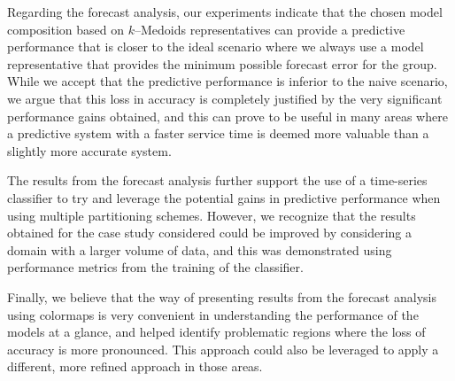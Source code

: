 Regarding the forecast analysis, our experiments indicate that the chosen model composition based on $k$--Medoids representatives can provide a predictive performance that is closer to the ideal scenario where we always use a model representative that provides the minimum possible forecast error for the group. While we accept that the predictive performance is inferior to the naive scenario, we argue that this loss in accuracy is completely justified by the very significant performance gains obtained, and this can prove to be useful in many areas where a predictive system with a faster service time is deemed more valuable than a slightly more accurate system.

The results from the forecast analysis further support the use of a time-series classifier to try and leverage the potential gains in predictive performance when using multiple partitioning schemes. However, we recognize that the results obtained for the case study considered could be improved by considering a domain with a larger volume of data, and this was demonstrated using performance metrics from the training of the classifier.

Finally, we believe that the way of presenting results from the forecast analysis using colormaps is very convenient in understanding the performance of the models at a glance, and helped identify problematic regions where the loss of accuracy is more pronounced. This approach could also be leveraged to apply a different, more refined approach in those areas.